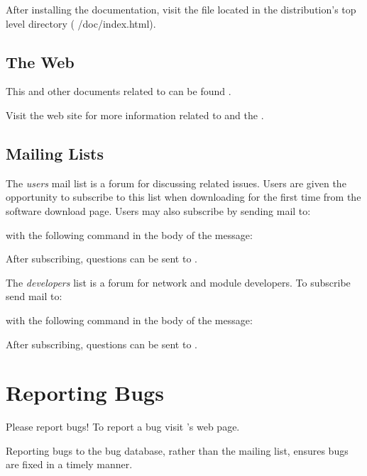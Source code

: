 After installing the documentation, visit the
 file located in the distribution's top level
 directory (\ie{} /doc/index.html).

\subsection{The Web}

This and other documents related to \sr{} can be found 
.

Visit the \htmladdnormallinkfoot{\sci}{\sciurl} web site for more
information related to \sr{} and the \scii{}.

\subsection{Mailing Lists}

The \sr{} \emph{users} mail list is a forum for discussing \sr{}
related issues.  Users are given the opportunity to subscribe to this
list when downloading \sr{} for the first time from the software
download page.  Users may also subscribe by sending mail to:


with the following command in the body of the message:


After subscribing,  questions can be sent to
.

The \sr{} \emph{developers} list is a forum for network and module
developers.  To subscribe send mail to:


with the following command in the body of the message:


After subscribing, questions can be sent to
.

\section{Reporting Bugs}
\label{sec:bugs}

Please report bugs!  To report a bug visit \sr{}'s
 web page.

Reporting bugs to the bug database, rather than the mailing list,  ensures
bugs are fixed in a timely manner.

